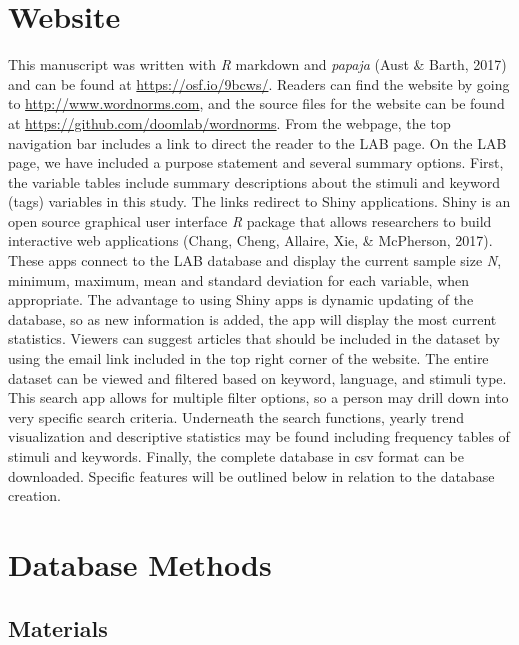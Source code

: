 \documentclass[english,man]{apa6}
\theoremstyle{definition}
\theoremstyle{definition}
\theoremstyle{definition}
\theoremstyle{remark}
\begin{document}
\section{Website}\label{website}

This manuscript was written with \emph{R} markdown and \emph{papaja}
(Aust \& Barth, 2017) and can be found at \url{https://osf.io/9bcws/}.
Readers can find the website by going to \url{http://www.wordnorms.com},
and the source files for the website can be found at
\url{https://github.com/doomlab/wordnorms}. From the webpage, the top
navigation bar includes a link to direct the reader to the LAB page. On
the LAB page, we have included a purpose statement and several summary
options. First, the variable tables include summary descriptions about
the stimuli and keyword (tags) variables in this study. The links
redirect to Shiny applications. Shiny is an open source graphical user
interface \emph{R} package that allows researchers to build interactive
web applications (Chang, Cheng, Allaire, Xie, \& McPherson, 2017). These
apps connect to the LAB database and display the current sample size
\emph{N}, minimum, maximum, mean and standard deviation for each
variable, when appropriate. The advantage to using Shiny apps is dynamic
updating of the database, so as new information is added, the app will
display the most current statistics. Viewers can suggest articles that
should be included in the dataset by using the email link included in
the top right corner of the website. The entire dataset can be viewed
and filtered based on keyword, language, and stimuli type. This search
app allows for multiple filter options, so a person may drill down into
very specific search criteria. Underneath the search functions, yearly
trend visualization and descriptive statistics may be found including
frequency tables of stimuli and keywords. Finally, the complete database
in csv format can be downloaded. Specific features will be outlined
below in relation to the database creation.

\section{Database Methods}\label{database-methods}

\subsection{Materials}\label{materials}
\end{document}

